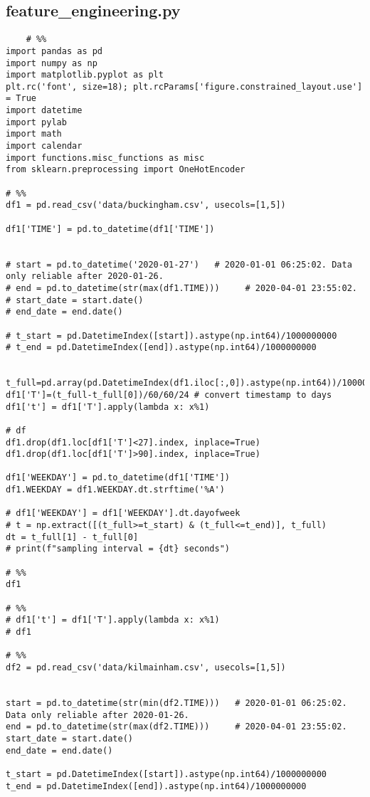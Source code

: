 \subsection{feature\_engineering.py}
\begin{verbatim}
    # %%
import pandas as pd
import numpy as np
import matplotlib.pyplot as plt
plt.rc('font', size=18); plt.rcParams['figure.constrained_layout.use'] = True
import datetime
import pylab
import math
import calendar
import functions.misc_functions as misc
from sklearn.preprocessing import OneHotEncoder

# %%
df1 = pd.read_csv('data/buckingham.csv', usecols=[1,5])

df1['TIME'] = pd.to_datetime(df1['TIME'])


# start = pd.to_datetime('2020-01-27')   # 2020-01-01 06:25:02. Data only reliable after 2020-01-26.
# end = pd.to_datetime(str(max(df1.TIME)))     # 2020-04-01 23:55:02. 
# start_date = start.date()
# end_date = end.date()

# t_start = pd.DatetimeIndex([start]).astype(np.int64)/1000000000
# t_end = pd.DatetimeIndex([end]).astype(np.int64)/1000000000


t_full=pd.array(pd.DatetimeIndex(df1.iloc[:,0]).astype(np.int64))/1000000000
df1['T']=(t_full-t_full[0])/60/60/24 # convert timestamp to days
df1['t'] = df1['T'].apply(lambda x: x%1)

# df
df1.drop(df1.loc[df1['T']<27].index, inplace=True)
df1.drop(df1.loc[df1['T']>90].index, inplace=True)

df1['WEEKDAY'] = pd.to_datetime(df1['TIME'])
df1.WEEKDAY = df1.WEEKDAY.dt.strftime('%A')

# df1['WEEKDAY'] = df1['WEEKDAY'].dt.dayofweek
# t = np.extract([(t_full>=t_start) & (t_full<=t_end)], t_full)
dt = t_full[1] - t_full[0]
# print(f"sampling interval = {dt} seconds")

# %%
df1

# %%
# df1['t'] = df1['T'].apply(lambda x: x%1)
# df1

# %%
df2 = pd.read_csv('data/kilmainham.csv', usecols=[1,5])


start = pd.to_datetime(str(min(df2.TIME)))   # 2020-01-01 06:25:02. Data only reliable after 2020-01-26.
end = pd.to_datetime(str(max(df2.TIME)))     # 2020-04-01 23:55:02. 
start_date = start.date()
end_date = end.date()

t_start = pd.DatetimeIndex([start]).astype(np.int64)/1000000000
t_end = pd.DatetimeIndex([end]).astype(np.int64)/1000000000



\end{verbatim}
